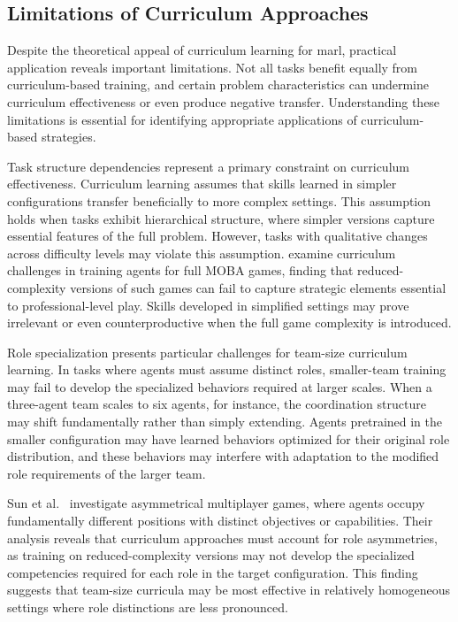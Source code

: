 \subsection{Limitations of Curriculum Approaches}
\label{subsec:curriculum-limitations}

Despite the theoretical appeal of curriculum learning for \gls{marl}, 
practical application reveals important limitations. Not all tasks 
benefit equally from curriculum-based training, and certain problem 
characteristics can undermine curriculum effectiveness or even produce negative transfer. 
Understanding these limitations is essential for identifying appropriate applications 
of curriculum-based strategies.

Task structure dependencies represent a primary constraint on curriculum effectiveness. 
Curriculum learning assumes that skills learned in simpler configurations transfer 
beneficially to more complex settings. This assumption holds when tasks exhibit 
hierarchical structure, where simpler versions capture essential features of 
the full problem. However, tasks with qualitative changes across difficulty 
levels may violate this assumption. 
\cite{ye2020} examine curriculum challenges in training agents for full MOBA games, 
finding that reduced-complexity versions of such games can fail to capture strategic 
elements essential to professional-level play. Skills developed in simplified 
settings may prove irrelevant or even counterproductive when the full game complexity is introduced.

Role specialization presents particular challenges for team-size curriculum learning. 
In tasks where agents must assume distinct roles, smaller-team training may fail to 
develop the specialized behaviors required at larger scales. 
When a three-agent team scales to six agents, for instance, 
the coordination structure may shift fundamentally rather than simply extending. 
Agents pretrained in the smaller configuration may have learned behaviors 
optimized for their original role distribution, and these behaviors may 
interfere with adaptation to the modified role requirements of the larger team.

Sun et al.~\cite{sun2023} investigate asymmetrical multiplayer games, where agents occupy 
fundamentally different positions with distinct objectives or capabilities. 
Their analysis reveals that curriculum approaches must account for role asymmetries, 
as training on reduced-complexity versions may not develop the specialized competencies 
required for each role in the target configuration. This finding suggests that 
team-size curricula may be most effective in relatively homogeneous settings 
where role distinctions are less pronounced.


